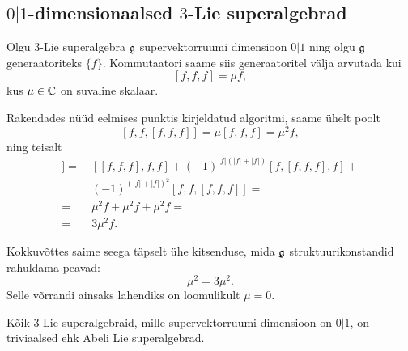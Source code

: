 
\subsection{\texorpdfstring{$0|1$}{0|1}-dimensionaalsed
    \texorpdfstring{$3$}{3}-Lie superalgebrad}

Olgu $3$-Lie superalgebra $\mathfrak{g}$ supervektorruumi dimensioon
$0|1$ ning olgu $\mathfrak{g}$ generaatoriteks $\{ f \}$. Kommutaatori saame
siis generaatoritel välja arvutada kui
\[ [f, f, f] = \mu f, \]
kus $\mu \in \mathbb{C}$ on suvaline skalaar.

Rakendades nüüd eelmises punktis kirjeldatud algoritmi, saame ühelt poolt
\[
    [f, f, [f, f, f]] = \mu [f, f, f] = \mu^2 f,
\]
ning teisalt
\begin{align*}
    [f, f, [f, f, f]] =&\
        [[f, f, f], f, f] +
        (-1)^{|f|(|f| + |f|)} [f, [f, f, f], f] + \\
        &\ (-1)^{(|f| + |f|)^2} [f, f, [f, f, f]] = \\
    =&\ \mu^2 f +  \mu^2 f +  \mu^2 f = \\
    =&\ 3\mu^2 f.
\end{align*}

Kokkuvõttes saime seega täpselt ühe kitsenduse, mida $\mathfrak{g}$ struktuurikonstandid
rahuldama peavad:
\[ \mu^2 = 3\mu^2. \]
Selle võrrandi ainsaks lahendiks on loomulikult $\mu = 0$.

\begin{thm}
    Kõik $3$-Lie superalgebraid, mille supervektorruumi dimensioon on $0|1$,
    on triviaalsed ehk Abeli Lie superalgebrad.
\end{thm}
